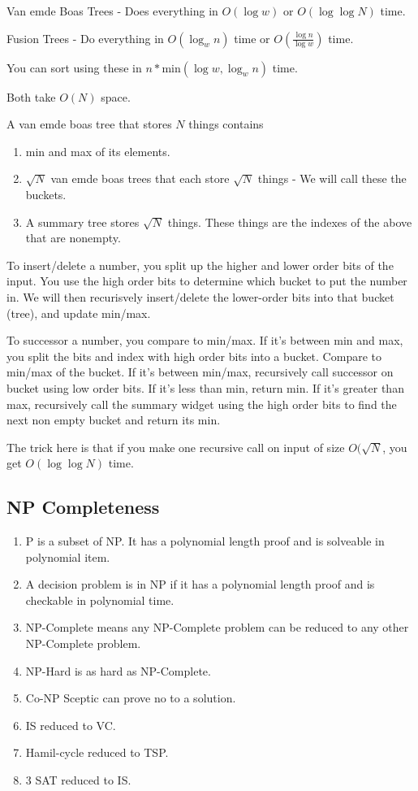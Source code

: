 \documentclass[12pt,twocolumn]{article}
\begin{document}
Van emde Boas Trees - Does everything in $O(\log w)$ or $O(\log \log N)$ time.

Fusion Trees - Do everything in $O(\log_{w}{n})$ time or $O(\frac{\log{n}}{\log{w}})$ time.

You can sort using these in $n * $min$(\log w, \log_{w}{n})$ time.

Both take $O(N)$ space.

A van emde boas tree that stores $N$ things contains
\begin{enumerate}
    \item min and max of its elements.
    \item $\sqrt{N}$ van emde boas trees that each store $\sqrt{N}$ things - We will call these the buckets.
    \item A summary tree stores $\sqrt{N}$ things. These things are the indexes of the above that are nonempty.
\end{enumerate}

To insert/delete a number, you split up the higher and lower order bits of the input. You use the high order bits to determine which bucket to put the number in. We will then recurisvely insert/delete the lower-order bits into that bucket (tree), and update min/max.

To successor a number, you compare to min/max. If it's between min and max, you split the bits and index with high order bits into a bucket. Compare to min/max of the bucket. If it's between min/max, recursively call successor on bucket using low order bits. If it's less than min, return min. If it's greater than max, recursively call the summary widget using the high order bits to find the next non empty bucket and return its min.

The trick here is that if you make one recursive call on input of size $O(\sqrt{N}$, you get $O(\log \log N)$ time.

\subsection{NP Completeness}
\begin{enumerate}
    \item P is a subset of NP. It has a polynomial length proof and is solveable in polynomial item.
    \item A decision problem is in NP if it has a polynomial length proof and is checkable in polynomial time.
    \item NP-Complete means any NP-Complete problem can be reduced to any other NP-Complete problem.
    \item NP-Hard is as hard as NP-Complete.
    \item Co-NP Sceptic can prove no to a solution.
    \item IS reduced to VC.
    \item Hamil-cycle reduced to TSP.
    \item 3 SAT reduced to IS.
\end{enumerate}
\end{document}
